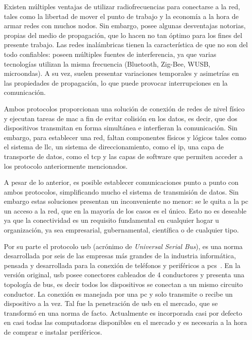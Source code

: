 Existen múltiples ventajas de utilizar radiofrecuencias para conectarse a la red, tales como la libertad de mover el punto de trabajo y la economía a la hora de armar redes con muchos nodos. Sin embargo, posee algunas desventajas notorias, propias del medio de propagación, que lo hacen no tan óptimo para los fines del presente trabajo. Las redes inalámbricas tienen la característica de que no son del todo confiables: poseen múltiples fuentes de interferencia, ya que varias tecnologías utilizan la misma frecuencia (Bluetooth, Zig-Bee, WUSB, microondas). A su vez, suelen presentar variaciones temporales y asimetrías en las propiedades de propagación, lo que puede provocar interrupciones en la comunicación.%

Ambos protocolos proporcionan una solución de conexión de redes de nivel físico y ejecutan tareas de \acrfull{mac} a fin de evitar colisión en los datos, es decir, que dos dispositivos transmitan en forma simultánea e interfieran la comunicación.
Sin embargo, para establecer una red, faltan componentes físicos y lógicos tales como el sistema de \acrfull{llc}, un sistema de direccionamiento, como el \acrfull{ip}, una capa de transporte de datos, como el \acrfull{tcp} y las capas de software que permiten acceder a los protocolo anteriormente mencionados.%

A pesar de lo anterior, es posible establecer comunicaciones punto a punto con ambos protocolos, simplificando mucho el sistema de transmisión de datos. Sin embargo estas soluciones presentan un inconveniente no menor: se le quita a la \acrshort{pc} un acceso a la red, que en la mayoría de los casos es el único. Esto no es deseable ya que la conectividad es un requisito fundamental en cualquier hogar u organización, ya sea empresarial, gubernamental, científica o de cualquier tipo.%

Por su parte el protocolo \acrshort{usb} (acrónimo de {\it Universal Serial Bus}), es una norma desarrollada por seis de las empresas más grandes de la industria informática, pensada y desarrollada para la conexión de teléfonos y periféricos a \acrshort{pc}s~\cite{USBspec}. En la versión original, \acrshort{usb} posee conectores cableados de 4 conductores y presenta una topología de bus, es decir todos los dispositivos se conectan a un mismo circuito conductor. La conexión es manejada por una \acrshort{pc} y solo transmite o recibe un dispositivo a la vez. Tal fue la penetración de \acrshort{usb} en el mercado, que se transformó en una norma de facto. Actualmente es incorporada casi por defecto en casi todas las computadoras disponibles en el mercado y es necesaria a la hora de comprar e instalar periféricos.%

